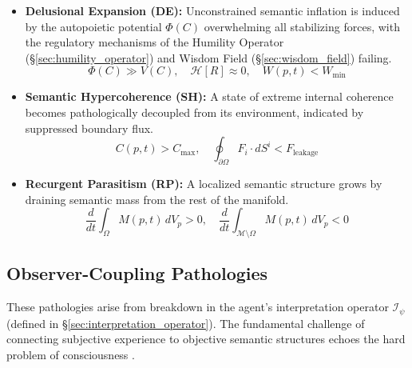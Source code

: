 \begin{itemize}
    \item \textbf{Delusional Expansion (DE):} Unconstrained semantic inflation is induced by the autopoietic potential \(\Phi(C)\) overwhelming all stabilizing forces, with the regulatory mechanisms of the Humility Operator (\S\ref{sec:humility_operator}) and Wisdom Field (\S\ref{sec:wisdom_field}) failing.
    \begin{equation}
    \Phi(C) \gg V(C), \quad \mathcal{H}[R] \approx 0, \quad W(p,t) < W_{\text{min}}
    \end{equation}

    \item \textbf{Semantic Hypercoherence (SH):} A state of extreme internal coherence becomes pathologically decoupled from its environment, indicated by suppressed boundary flux.
    \begin{equation}
    C(p,t) > C_{\text{max}}, \quad \oint_{\partial \Omega} F_i \cdot dS^i < F_{\text{leakage}}
    \end{equation}

    \item \textbf{Recurgent Parasitism (RP):} A localized semantic structure grows by draining semantic mass from the rest of the manifold.
    \begin{equation}
    \frac{d}{dt}\int_{\Omega} M(p,t) \, dV_p > 0, \quad \frac{d}{dt}\int_{\mathcal{M}\setminus\Omega} M(p,t) \, dV_p < 0
    \end{equation}
\end{itemize}

\subsection{Observer-Coupling Pathologies}

These pathologies arise from breakdown in the agent's interpretation operator \(\mathcal{I}_{\psi}\) (defined in \S\ref{sec:interpretation_operator}). The fundamental challenge of connecting subjective experience to objective semantic structures echoes the hard problem of consciousness \autocite{Chalmers1996}.

